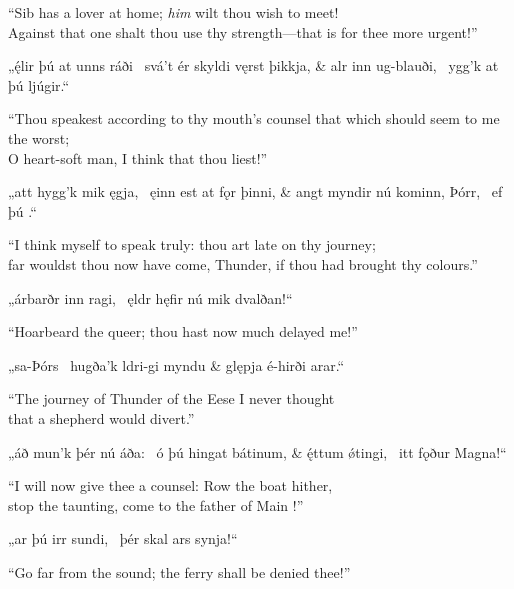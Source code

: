 \bvb “Sib has a lover at home; \emph{him} wilt thou wish to meet! \\
Against that one shalt thou use thy strength—that is for thee more urgent!”\evb\evg


\bvg\bva{}„ę́lir þú at unns ráði \hld\ svá’t ér skyldi vęrst þikkja, &
alr inn ug-blauði, \hld\ ygg’k at þú ljúgir.“\eva

\bvb “Thou speakest according to thy mouth’s counsel that which should seem to me the worst; \\
O heart-soft man, I think that thou liest!”\evb\evg


\bvg\bva{}„att hygg’k mik ęgja, \hld\ ęinn est at fǫr þinni, &
angt myndir nú kominn, Þórr, \hld\ ef þú .“\eva

\bvb “I think myself to speak truly: thou art late on thy journey; \\
far wouldst thou now have come, Thunder, if thou had brought thy colours.”\evb\evg


\bvg\bva{}„árbarðr inn ragi, \hld\ ęldr hęfir nú mik dvalðan!“\eva

\bvb “Hoarbeard the queer; thou hast now much delayed me!”\evb\evg


\bvg\bva{}„sa-Þórs \hld\ hugða’k ldri-gi myndu &
\ind glępja é-hirði arar.“\eva

\bvb “The journey of Thunder of the Eese I never thought \\
that a shepherd would divert.”\evb\evg


\bvg\bva{}„áð mun’k þér nú áða: \hld\ ó þú hingat bátinum, &
ę́ttum ǿtingi, \hld\ itt fǫður Magna!“\eva

\bvb “I will now give thee a counsel: Row the boat hither, \\
stop the taunting, come to the father of Main !”\evb\evg


\bvg\bva{}„ar þú irr sundi, \hld\ þér skal ars synja!“\eva

\bvb “Go far from the sound; the ferry shall be denied thee!”\evb\evg


